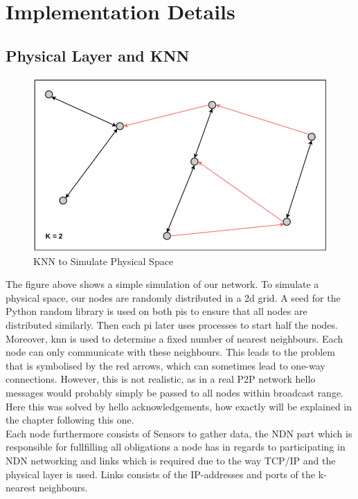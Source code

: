 \documentclass{article}
\begin{document}
	\section{Implementation Details}
	\subsection{Physical Layer and KNN}
	\begin{figure}[H]
		\centering
		\includegraphics[scale=0.4]{media/knn.png}
		\caption{KNN to Simulate Physical Space}
		\label{fig:knn}
	\end{figure}
	The figure above shows a simple simulation of our network. To simulate a physical space, our nodes are randomly distributed in a 2d grid. A seed for the Python random library is used on both pis to ensure that all nodes are distributed similarly. Then each pi later uses processes to start half the nodes. Moreover, knn is used to determine a fixed number of nearest neighbours. Each node can only communicate with these neighbours. This leads to the problem that is symbolised by the red arrows, which can sometimes lead to one-way connections. However, this is not realistic, as in a real P2P network hello messages would probably simply be passed to all nodes within broadcast range. Here this was solved by hello acknowledgements, how exactly will be explained in the chapter following this one.\\
	Each node furthermore consists of Sensors to gather data, the NDN part which is responsible for fullfilling all obligations a node has in regards to participating in NDN networking and links which is required due to the way TCP/IP and the physical layer is used. Links consists of the IP-addresses and ports of the k-nearest neighbours.
\end{document}
